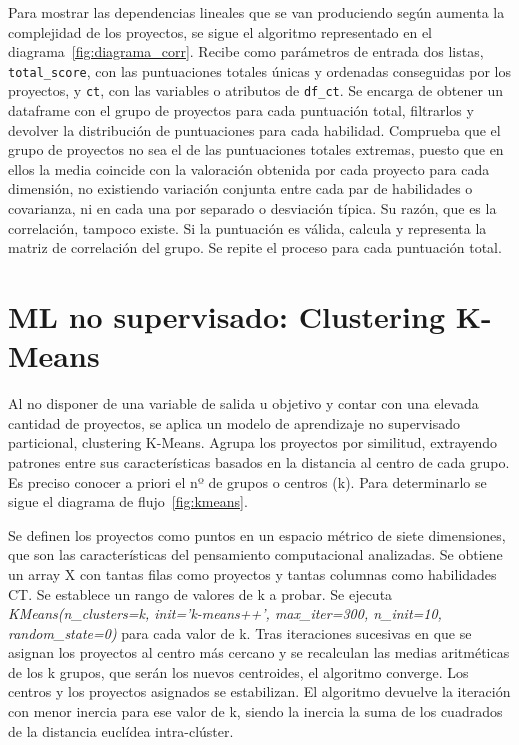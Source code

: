 \documentclass[a4paper, 12pt]{book}
\begin{document}
Para mostrar las dependencias lineales que se van produciendo según aumenta la complejidad de los proyectos, se sigue el algoritmo representado en el diagrama~\ref{fig:diagrama_corr}. Recibe como parámetros de entrada dos listas, \texttt{total\_score}, con las puntuaciones totales únicas y ordenadas conseguidas por los proyectos, y \texttt{ct}, con las variables o atributos de \texttt{df\_ct}. Se encarga de obtener un dataframe con el grupo de proyectos para cada puntuación total, filtrarlos y devolver la distribución de puntuaciones para cada habilidad. Comprueba que el grupo de proyectos no sea el de las puntuaciones totales extremas, puesto que en ellos la media coincide con la valoración obtenida por cada proyecto para cada dimensión, no existiendo variación conjunta entre cada par de habilidades o covarianza, ni en cada una por separado o desviación típica. Su razón, que es la correlación, tampoco existe. Si la puntuación es válida, calcula y representa la matriz de correlación del grupo. Se repite el proceso para cada puntuación total. 

\section{ML no supervisado: Clustering K-Means}  
\label{sec:k_means diseño}

Al no disponer de una variable de salida u objetivo y contar con una elevada cantidad de proyectos, se aplica un modelo de aprendizaje no supervisado particional, clustering K-Means. Agrupa los proyectos por similitud, extrayendo patrones entre sus características basados en la  distancia al centro de cada grupo. Es preciso conocer a priori el nº de grupos o centros (k). Para determinarlo se sigue el diagrama de flujo~\ref{fig:kmeans}. 

Se definen los proyectos como puntos en un espacio métrico de siete dimensiones, que son las características del pensamiento computacional analizadas. Se obtiene un array X con tantas filas como proyectos y tantas columnas como habilidades CT. Se establece un rango de valores de k a probar. Se ejecuta \emph{KMeans(n\_clusters=k, init='k-means++', max\_iter=300, n\_init=10, random\_state=0)} para cada valor de k. Tras iteraciones sucesivas en que se asignan los proyectos al centro más cercano y se recalculan las medias aritméticas de los k grupos, que serán los nuevos centroides, el algoritmo converge. Los centros y los proyectos asignados se estabilizan. El algoritmo devuelve la iteración con menor inercia para ese valor de k, siendo la inercia la suma de los cuadrados de la distancia euclídea intra-clúster.
\end{document}
